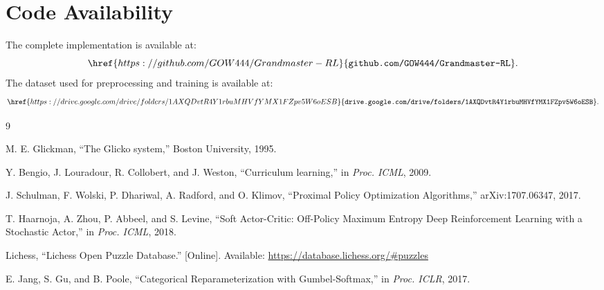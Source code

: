 \documentclass[10pt,twocolumn]{article}
\begin{document}
\section*{Code Availability}

The complete implementation is available at:
\[
\href{https://github.com/GOW444/Grandmaster-RL}{\texttt{github.com/GOW444/Grandmaster-RL}}.
\]
The dataset used for preprocessing and training is available at:
\[
\href{https://drive.google.com/drive/folders/1AXQDvtR4Y1rbuMHVfYMX1FZpv5W6oESB}
{\texttt{drive.google.com/drive/folders/1AXQDvtR4Y1rbuMHVfYMX1FZpv5W6oESB}}.
\]

\begin{thebibliography}{9}

M. E. Glickman, ``The Glicko system,'' Boston University, 1995.

Y. Bengio, J. Louradour, R. Collobert, and J. Weston, ``Curriculum learning,'' in
\textit{Proc. ICML}, 2009.

J. Schulman, F. Wolski, P. Dhariwal, A. Radford, and O. Klimov, ``Proximal Policy
Optimization Algorithms,'' arXiv:1707.06347, 2017.

T. Haarnoja, A. Zhou, P. Abbeel, and S. Levine, ``Soft Actor-Critic: Off-Policy
Maximum Entropy Deep Reinforcement Learning with a Stochastic Actor,'' in
\textit{Proc. ICML}, 2018.

Lichess, ``Lichess Open Puzzle Database.'' [Online]. Available:
\url{https://database.lichess.org/#puzzles}

E. Jang, S. Gu, and B. Poole, ``Categorical Reparameterization with Gumbel-Softmax,''
in \textit{Proc. ICLR}, 2017.

\end{thebibliography}
\end{document}
